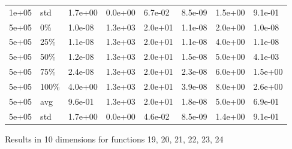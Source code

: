 \documentclass[11pt]{article}
\begin{document}
\begin{longtable}{llllllll}
  1e+05 & std & 1.7e+00 & 0.0e+00 & 6.7e-02 & 8.5e-09 & 1.5e+00 & 9.1e-01 \\ 
  5e+05 & 0\% & 1.0e-08 & 1.3e+03 & 2.0e+01 & 1.1e-08 & 2.0e+00 & 1.0e-08 \\ 
  5e+05 & 25\% & 1.1e-08 & 1.3e+03 & 2.0e+01 & 1.1e-08 & 4.0e+00 & 1.1e-08 \\ 
  5e+05 & 50\% & 1.2e-08 & 1.3e+03 & 2.0e+01 & 1.5e-08 & 5.0e+00 & 4.1e-03 \\ 
  5e+05 & 75\% & 2.4e-08 & 1.3e+03 & 2.0e+01 & 2.3e-08 & 6.0e+00 & 1.5e+00 \\ 
  5e+05 & 100\% & 4.0e+00 & 1.3e+03 & 2.0e+01 & 3.9e-08 & 8.0e+00 & 2.6e+00 \\ 
  5e+05 & avg & 9.6e-01 & 1.3e+03 & 2.0e+01 & 1.8e-08 & 5.0e+00 & 6.9e-01 \\ 
  5e+05 & std & 1.7e+00 & 0.0e+00 & 4.6e-02 & 8.5e-09 & 1.4e+00 & 9.1e-01 \\ 
   \hline
\hline
\end{longtable}
\newpage
Results in 10 dimensions for functions 19, 20, 21, 22, 23, 24
\end{document}
